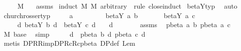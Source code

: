 \begin{isabellebody}
\ \ \ {\isachardoublequoteopen}{\isasymGamma}\ {\isasymturnstile}\ M{\isacharprime}\ {\isacharcolon}\ {\isasymsigma}{\isachardoublequoteclose}\isanewline
%
\isadelimproof
%
\endisadelimproof
%
\isatagproof
{}\isamarkupfalse%
\ assms{\isacharparenleft}{}{\isacharcomma}{}{\isacharparenright}\isanewline
{}\isamarkupfalse%
\ {\isacharparenleft}induct\ M\ M{\isacharprime}\ arbitrary{\isacharcolon}\ {\isasymsigma}\ rule{\isacharcolon}\ close{\isachardot}induct{\isacharparenright}\isanewline
{}\isamarkupfalse%
\ beta{\isacharunderscore}Y{\isacharunderscore}typ\ \isamarkupfalse%
\ auto%
\endisatagproof
{\isafoldproof}%
%
\isadelimproof
%
\endisadelimproof
%
\isamarkuptrue%
\isamarkupfalse%
\ church{\isacharunderscore}rosser{\isacharunderscore}typ{\isacharcolon}\isanewline
\ \ \ {\isachardoublequoteopen}{\isasymGamma}\ {\isasymturnstile}\ a\ {\isacharcolon}\ {\isasymsigma}{\isachardoublequoteclose}\isanewline
\ \ \ \ \ \ \ {\isachardoublequoteopen}beta{\isacharunderscore}Y{\isacharasterisk}\ a\ b{\isachardoublequoteclose}\isanewline
\ \ \ \ \ \ \ {\isachardoublequoteopen}beta{\isacharunderscore}Y{\isacharasterisk}\ a\ c{\isachardoublequoteclose}\isanewline
\ \ \ \ \ {\isachardoublequoteopen}{\isasymexists}d{\isachardot}\ beta{\isacharunderscore}Y{\isacharasterisk}\ b\ d\ {\isasymand}\ beta{\isacharunderscore}Y{\isacharasterisk}\ c\ d\ {\isasymand}\ {\isasymGamma}\ {\isasymturnstile}\ d\ {\isacharcolon}\ {\isasymsigma}{\isachardoublequoteclose}\isanewline
%
\isadelimproof
%
\endisadelimproof
%
\isatagproof
{}\isamarkupfalse%
\ {\isacharminus}\isanewline
\ \ \isamarkupfalse%
\ assms\ \isamarkupfalse%
\ {\isachardoublequoteopen}pbeta{\isacharasterisk}\ a\ b{\isachardoublequoteclose}\ {\isachardoublequoteopen}pbeta{\isacharasterisk}\ a\ c{\isachardoublequoteclose}\ \isamarkupfalse%
\ M{}\ base\ \isamarkupfalse%
\ simp{\isacharplus}\isanewline
\ \ \isamarkupfalse%
\ \isamarkupfalse%
\ d\ \ {\isachardoublequoteopen}pbeta{\isacharasterisk}\ b\ d{\isachardoublequoteclose}\ {\isachardoublequoteopen}pbeta{\isacharasterisk}\ c\ d{\isachardoublequoteclose}\ \isamarkupfalse%
\ {\isacharparenleft}metis\ DP{\isacharunderscore}R{\isacharunderscore}R{\isacharunderscore}imp{\isacharunderscore}DP{\isacharunderscore}Rc{\isacharunderscore}Rc{\isacharunderscore}pbeta\ DP{\isacharunderscore}def\ Lem{}{\isacharunderscore}{}{\isacharunderscore}{}{\isacharparenright}\ \isanewline

\end{isabellebody}
